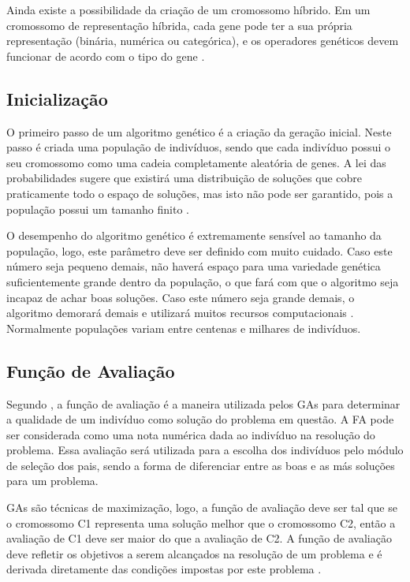 \documentclass[12pt,oneside,a4paper,english,french,spanish,brazil,]{abntex2}
\begin{document}
Ainda existe a possibilidade da criação de um cromossomo híbrido. Em um cromossomo de representação híbrida, cada gene pode ter a sua própria representação (binária, numérica ou categórica), e os operadores genéticos devem funcionar de acordo com o tipo do gene \cite{linden:2008}.

\subsection{Inicialização}

O primeiro passo de um algoritmo genético é a criação da geração inicial. Neste passo é criada uma população de indivíduos, sendo que cada indivíduo possui o seu cromossomo como uma cadeia completamente aleatória de genes. A lei das probabilidades sugere que existirá uma distribuição de soluções que cobre praticamente todo o espaço de soluções, mas isto não pode ser garantido, pois a população possui um tamanho finito \cite{linden:2008}.

O desempenho do algoritmo genético é extremamente sensível ao tamanho da população, logo, este parâmetro deve ser definido com muito cuidado. Caso este número seja pequeno demais, não haverá espaço para uma variedade genética suficientemente grande dentro da população, o que fará com que o algoritmo seja incapaz de achar boas soluções. Caso este número seja grande demais, o algoritmo demorará demais e utilizará muitos recursos computacionais  \cite{linden:2008}. Normalmente populações variam entre centenas e milhares de indivíduos.

\subsection{Função de Avaliação}
\label{sec:Funcao_de_Avaliacao}

Segundo \citet{linden:2008}, a função de avaliação é a maneira utilizada pelos GAs para determinar a qualidade de um indivíduo como solução do problema em questão. A FA pode ser considerada como uma nota numérica dada ao indivíduo na resolução do problema. Essa avaliação será utilizada para a escolha dos indivíduos pelo módulo de seleção dos pais, sendo a forma de diferenciar entre as boas e as más soluções para um problema.

GAs são técnicas de maximização, logo, a função de avaliação deve ser tal que se o cromossomo C1 representa uma solução melhor que o cromossomo C2, então a avaliação de C1 deve ser maior do que a avaliação de C2. A função de avaliação deve refletir os objetivos a serem alcançados na resolução de um problema e é derivada diretamente das condições impostas por este problema \cite{holland:1992}.
\end{document}
